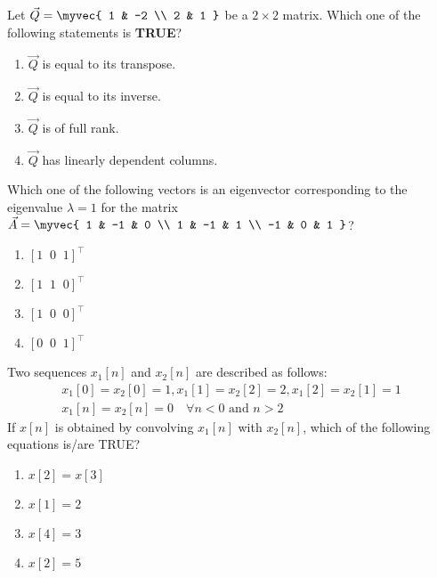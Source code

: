 \item Let 
$
\vec{Q} = \myvec{
1 & -2 \\
2 & 1
}
$
be a \(2 \times 2\) matrix. Which one of the following statements is \textbf{TRUE}?

\hfill{}
\begin{multicols}{2}
\begin{enumerate}
    \item \(\vec{Q}\) is equal to its transpose.
    \item \(\vec{Q}\) is equal to its inverse.
    \item \(\vec{Q}\) is of full rank.
    \item \(\vec{Q}\) has linearly dependent columns.
\end{enumerate}
\end{multicols}
\item 
Which one of the following vectors is an eigenvector corresponding to the eigenvalue \(\lambda = 1\) for the matrix 
$
\vec{A} = \myvec{
1 & -1 & 0 \\
1 & -1 & 1 \\
-1 & 0 & 1
}
$?
\hfill{}
\begin{multicols}{4}
\begin{enumerate}
    \item \([1 \;\; 0 \;\; 1]^{\top}\)
    \item \([1 \;\; 1 \;\; 0]^{\top}\)
    \item \([1 \;\; 0 \;\; 0]^{\top}\)
    \item \([0 \;\; 0 \;\; 1]^{\top}\)
\end{enumerate}
\end{multicols}
\item 
Two sequences \( x_1[n] \) and \( x_2[n] \) are described as follows:
\begin{align*}
x_1[0] = x_2[0] = 1,
x_1[1] = x_2[2] = 2,
x_1[2] = x_2[1] = 1
\\
x_1[n] = x_2[n] = 0 \quad \forall n < 0 \text{ and } n > 2
\end{align*}
If \( x[n] \) is obtained by convolving \( x_1[n] \) with \( x_2[n] \), which of the following equations is/are TRUE?
\hfill{}
\begin{multicols}{4}
\begin{enumerate}
    \item \( x[2] = x[3] \)
    \item \( x[1] = 2 \)
    \item \( x[4] = 3 \)
    \item \( x[2] = 5 \)
\end{enumerate}
\end{multicols}
